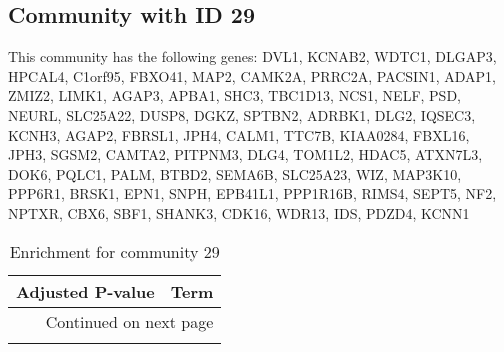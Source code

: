 \subsection*{Community with ID 29}
This community has the following genes: DVL1, KCNAB2, WDTC1, DLGAP3, HPCAL4, C1orf95, FBXO41, MAP2, CAMK2A, PRRC2A, PACSIN1, ADAP1, ZMIZ2, LIMK1, AGAP3, APBA1, SHC3, TBC1D13, NCS1, NELF, PSD, NEURL, SLC25A22, DUSP8, DGKZ, SPTBN2, ADRBK1, DLG2, IQSEC3, KCNH3, AGAP2, FBRSL1, JPH4, CALM1, TTC7B, KIAA0284, FBXL16, JPH3, SGSM2, CAMTA2, PITPNM3, DLG4, TOM1L2, HDAC5, ATXN7L3, DOK6, PQLC1, PALM, BTBD2, SEMA6B, SLC25A23, WIZ, MAP3K10, PPP6R1, BRSK1, EPN1, SNPH, EPB41L1, PPP1R16B, RIMS4, SEPT5, NF2, NPTXR, CBX6, SBF1, SHANK3, CDK16, WDR13, IDS, PDZD4, KCNN1
\\
\begin{longtable}{p{2.4cm}p{14.5cm}}
\caption{Enrichment for community 29}\\
\toprule
Adjusted \newline P-value &                                                                                                               Term \\
\midrule
\endhead
\midrule
\multicolumn{2}{r}{{Continued on next page}} \\
\midrule
\endfoot


\end{longtable}
